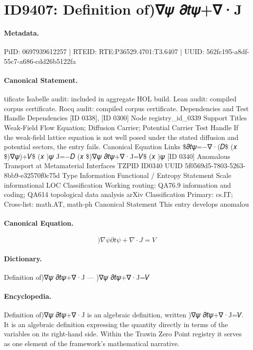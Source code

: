 \section*{ID9407: Definition of)∇𝜓 𝜕𝑡𝜓+∇·J}
\paragraph{Metadata.}
PiID: 0697939612257 | RTEID: RTE:P36529.4701:T3.6407 | UUID: 562fc195-a8df-55c7-a686-cdd26b5122fa

\paragraph{Canonical Statement.}
tificate Isabelle audit: included in aggregate HOL build. Lean audit: compiled corpus certificate. Rocq audit: compiled corpus certificate. Dependencies and Test Handle Dependencies [ID 0338], [ID 0300] Node registry\_id\_0339 Support Titles Weak-Field Flow Equation; Diffusion Carrier; Potential Carrier Test Handle If the weak-field lattice equation is not well posed under the stated diffusion and potential sectors, the entry fails. Canonical Equation Links \$𝜕𝑡𝜓=−∇·(𝐷\$ (𝑥 \$)∇𝜓)+𝑉\$ (𝑥 )𝜓 J=−𝐷 (𝑥 \$)∇𝜓 𝜕𝑡𝜓+∇·J=𝑉\$ (𝑥 )𝜓 [ID 0340] Anomalous Transport at Metamaterial Interfaces TZPID ID0340 UUID 5f0569d5-7803-5263-8bb9-e32570f0c75d Type Information Functional / Entropy Statement Scale informational LOC Classification Working routing: QA76.9 information and coding; QA614 topological data analysis arXiv Classification Primary: cs.IT; Cross-list: math.AT, math-ph Canonical Statement This entry develops anomalou

\paragraph{Canonical Equation.}
\[
)∇𝜓 𝜕𝑡𝜓+∇·J=𝑉
\]

\paragraph{Dictionary.}
Definition of)∇𝜓 𝜕𝑡𝜓+∇·J — )∇𝜓 𝜕𝑡𝜓+∇·J=𝑉

\paragraph{Encyclopedia.}
Definition of)∇𝜓 𝜕𝑡𝜓+∇·J is an algebraic definition, written )∇𝜓 𝜕𝑡𝜓+∇·J=𝑉. It is an algebraic definition expressing the quantity directly in terms of the variables on its right-hand side. Within the Trawin Zero Point registry it serves as one element of the framework's mathematical narrative.
